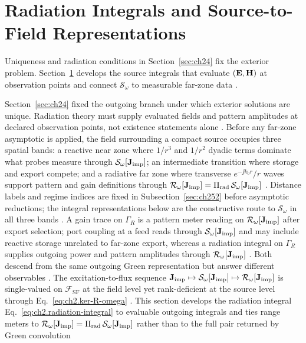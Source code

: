 \section{Radiation Integrals and Source-to-Field Representations}
\label{sec:ch25}
Uniqueness and radiation conditions in Section~\ref{sec:ch24} fix the exterior problem.
Section~\ref{sec:ch25} develops the source integrals that evaluate $(\mathbf{E},\mathbf{H})$ at observation
points and connect $\mathcal{S}_\omega$ to measurable far-zone data \cite{stratton1941}.




Section~\ref{sec:ch24} fixed the outgoing branch under which exterior solutions are unique.
Radiation theory must supply evaluated fields and pattern amplitudes at declared observation
points, not existence statements alone \cite{poynting1884}. Before any
far-zone asymptotic is applied, the field surrounding a compact source occupies three spatial
bands: a reactive near zone where $1/r^{3}$ and $1/r^{2}$ dyadic terms dominate what probes
measure through $\mathcal{S}_\omega[\mathbf{J}_{\mathrm{imp}}]$; an intermediate transition where storage and export
compete; and a radiative far zone where transverse $e^{-\jj k_0 r}/r$ waves support pattern and
gain definitions through $\mathcal{R}_\omega[\mathbf{J}_{\mathrm{imp}}]=\Pi_{\mathrm{rad}}\,\mathcal{S}_\omega[\mathbf{J}_{\mathrm{imp}}]$
\cite{stratton1941}. Distance labels and regime indices are fixed in
Subsection~\ref{sec:ch252} before asymptotic reductions; the integral representations below are
the constructive route to $\mathcal{S}_\omega$ in all three bands \cite{stratton1941}. A gain trace
on $\Gamma_R$ is a pattern meter reading on $\mathcal{R}_\omega[\mathbf{J}_{\mathrm{imp}}]$ after export selection;
port coupling at a feed reads through $\mathcal{S}_\omega[\mathbf{J}_{\mathrm{imp}}]$ and may include reactive
storage unrelated to far-zone export, whereas a radiation integral on $\Gamma_R$ supplies
outgoing power and pattern amplitudes through $\mathcal{R}_\omega[\mathbf{J}_{\mathrm{imp}}]$ \cite{harrington2001}.
Both descend from the same outgoing Green representation but answer different observables
\cite{stratton1941}.
The excitation-to-flux sequence $\mathbf{J}_{\mathrm{imp}}\mapsto\mathcal{S}_\omega[\mathbf{J}_{\mathrm{imp}}]\mapsto\mathcal{R}_\omega[\mathbf{J}_{\mathrm{imp}}]$
is single-valued on $\mathcal{F}_{\mathrm{SF}}$ at the field level yet rank-deficient at the
source level through Eq.~\eqref{eq:ch2.ker-R-omega} \cite{stratton1941}. This
section develops the radiation integral Eq.~\eqref{eq:ch2.radiation-integral} to
evaluable outgoing integrals and ties range meters to
$\mathcal{R}_\omega[\mathbf{J}_{\mathrm{imp}}]=\Pi_{\mathrm{rad}}\,\mathcal{S}_\omega[\mathbf{J}_{\mathrm{imp}}]$ rather than to
the full pair returned by Green convolution
